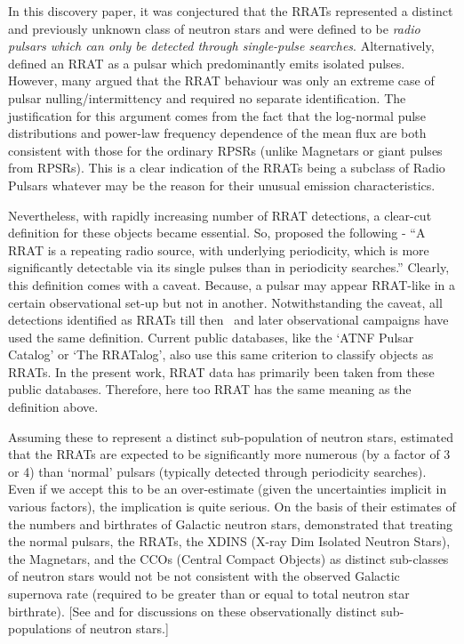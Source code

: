 \documentclass{jaa}
\begin{document}
In this discovery paper, it was conjectured that the RRATs represented
a  distinct and  previously unknown  class of  neutron stars  and were
defined to  be {\em radio pulsars  which can only be  detected through
  single-pulse  searches}. Alternatively,   defined  an
RRAT as a  pulsar which predominantly emits  isolated pulses. However,
many argued that the RRAT behaviour was only an extreme case of pulsar
nulling/intermittency  and required  no separate  identification.  The
justification  for  this  argument  comes   from  the  fact  that  the
log-normal pulse  distributions and power-law frequency  dependence of
the mean  flux are both consistent  with those for the  ordinary RPSRs
(unlike  Magnetars or  giant  pulses  from RPSRs).   This  is a  clear
indication of the RRATs being a subclass of Radio Pulsars whatever may
be the reason for their unusual emission characteristics.

Nevertheless,  with rapidly  increasing number  of RRAT  detections, a
clear-cut  definition   for  these  objects  became   essential.   So,
  proposed the  following -  ``A RRAT  is a  repeating
radio source, with underlying periodicity, which is more significantly
detectable  via  its single  pulses  than  in periodicity  searches.''
Clearly, this  definition comes with  a caveat. Because, a  pulsar may
appear RRAT-like in a certain observational set-up but not in another.
Notwithstanding the  caveat, all  detections identified as  RRATs till
then~\cite{mclau06,hesse08,shito09,keane10b,burke10,keane11a,burke11}
and    later   observational    campaigns   have    used   the    same
definition. Current public databases, like the `ATNF Pulsar Catalog' or
`The RRATalog',  also use this  same criterion to classify  objects as
RRATs. In  the present work, RRAT  data has primarily been  taken from
these public databases.  Therefore, here too RRAT has the same meaning
as the definition above.

Assuming  these  to represent  a  distinct  sub-population of  neutron
stars,   estimated that  the RRATs  are expected  to be
significantly more  numerous (by  a factor  of 3  or 4)  than `normal'
pulsars (typically detected through  periodicity searches). Even if we
accept this to  be an over-estimate (given  the uncertainties implicit
in various factors),  the implication is quite serious.   On the basis
of their estimates  of the numbers and birthrates  of Galactic neutron
stars,  demonstrated that  treating the normal pulsars,
the  RRATs,  the  XDINS  (X-ray   Dim  Isolated  Neutron  Stars),  the
Magnetars,  and  the  CCOs   (Central  Compact  Objects)  as  distinct
sub-classes  of neutron  stars would  not be  not consistent  with the
observed Galactic supernova rate (required to be greater than or equal
to  total   neutron  star   birthrate).   [See     and
   for  discussions on these  observationally distinct
  sub-populations of neutron stars.]
\end{document}
